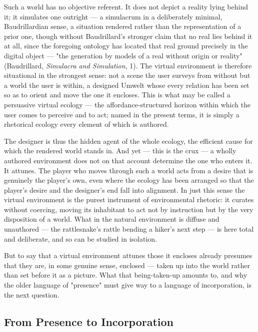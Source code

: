 \documentclass{article}
\begin{document}
Such a world has no objective referent. It does not depict a reality lying behind it; it simulates one outright — a simulacrum in a deliberately minimal, Baudrillardian sense, a situation rendered rather than the representation of a prior one, though without Baudrillard's stronger claim that no real lies behind it at all, since the foregoing ontology has located that real ground precisely in the digital object — "the generation by models of a real without origin or reality" (Baudrillard, \textit{Simulacra and Simulation}, 1). The virtual environment is therefore situational in the strongest sense: not a scene the user surveys from without but a world the user is within, a designed Umwelt whose every relation has been set so as to orient and move the one it encloses. This is what may be called a persuasive virtual ecology — the affordance-structured horizon within which the user comes to perceive and to act; named in the present terms, it is simply a rhetorical ecology every element of which is authored.

The designer is thus the hidden agent of the whole ecology, the efficient cause for which the rendered world stands in. And yet — this is the crux — a wholly authored environment does not on that account determine the one who enters it. It attunes. The player who moves through such a world acts from a desire that is genuinely the player's own, even where the ecology has been arranged so that the player's desire and the designer's end fall into alignment. In just this sense the virtual environment is the purest instrument of environmental rhetoric: it curates without coercing, moving its inhabitant to act not by instruction but by the very disposition of a world. What in the natural environment is diffuse and unauthored — the rattlesnake's rattle bending a hiker's next step — is here total and deliberate, and so can be studied in isolation.

But to say that a virtual environment attunes those it encloses already presumes that they are, in some genuine sense, enclosed — taken up into the world rather than set before it as a picture. What that being-taken-up amounts to, and why the older language of "presence" must give way to a language of incorporation, is the next question.

\bigskip

\subsection*{From Presence to Incorporation}
\end{document}
